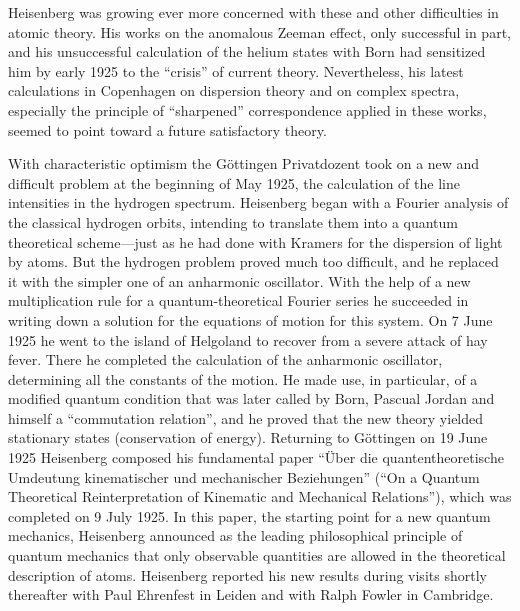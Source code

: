 \documentclass{article}
\begin{document}
Heisenberg was growing ever more concerned with these and other difficulties in atomic theory. His works on the anomalous Zeeman effect, only successful in part, and his unsuccessful calculation of the helium states with Born had sensitized him by early 1925 to the “crisis” of current theory. Nevertheless, his latest calculations in Copenhagen on dispersion theory and on complex spectra, especially the principle of “sharpened” correspondence applied in these works, seemed to point toward a future satisfactory theory.

With characteristic optimism the Göttingen Privatdozent took on a new and difficult problem at the beginning of May 1925, the calculation of the line intensities in the hydrogen spectrum. Heisenberg began with a Fourier analysis of the classical hydrogen orbits, intending to translate them into a quantum theoretical scheme---just as he had done with Kramers for the dispersion of light by atoms. But the hydrogen problem proved much too difficult, and he replaced it with the simpler one of an anharmonic oscillator. With the help of a new multiplication rule for a quantum-theoretical Fourier series he succeeded in writing down a solution for the equations of motion for this system. On 7 June 1925 he went to the island of Helgoland to recover from a severe attack of hay fever. There he completed the calculation of the anharmonic oscillator, determining all the constants of the motion. He made use, in particular, of a modified quantum condition that was later called by Born, Pascual Jordan and himself a “commutation relation”, and he proved that the new theory yielded stationary states (conservation of energy). Returning to Göttingen on 19 June 1925 Heisenberg composed his fundamental paper “Über die quantentheoretische Umdeutung kinematischer und mechanischer Beziehungen” (“On a Quantum Theoretical Reinterpretation of Kinematic and Mechanical Relations”), which was completed on 9 July 1925. In this paper, the starting point for a new quantum mechanics, Heisenberg announced as the leading philosophical principle of quantum mechanics that only observable quantities are allowed in the theoretical description of atoms. Heisenberg reported his new results during visits shortly thereafter with Paul Ehrenfest in Leiden and with Ralph Fowler in Cambridge.
\end{document}

